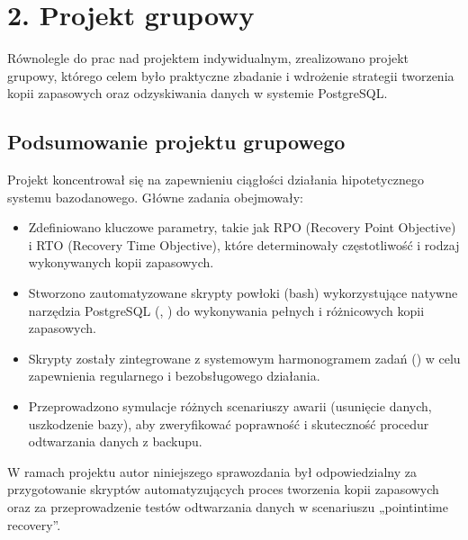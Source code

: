 \documentclass[letterpaper,10pt,polish]{sphinxmanual}
\begin{document}
\sphinxstepscope


\chapter{2. Projekt grupowy}
\label{\detokenize{rozdzial2/rozdzial2:projekt-grupowy}}\label{\detokenize{rozdzial2/rozdzial2::doc}}
\sphinxAtStartPar
Równolegle do prac nad projektem indywidualnym, zrealizowano projekt grupowy, którego celem było praktyczne zbadanie i wdrożenie strategii tworzenia kopii zapasowych oraz odzyskiwania danych w systemie PostgreSQL.


\section{Podsumowanie projektu grupowego}
\label{\detokenize{rozdzial2/rozdzial2:podsumowanie-projektu-grupowego}}
\sphinxAtStartPar
Projekt koncentrował się na zapewnieniu ciągłości działania hipotetycznego systemu bazodanowego. Główne zadania obejmowały:
\begin{itemize}
\item {} 
\sphinxAtStartPar
{} Zdefiniowano kluczowe parametry, takie jak RPO (Recovery Point Objective) i RTO (Recovery Time Objective), które determinowały częstotliwość i rodzaj wykonywanych kopii zapasowych.

\item {} 
\sphinxAtStartPar
{} Stworzono zautomatyzowane skrypty powłoki (bash) wykorzystujące natywne narzędzia PostgreSQL (, ) do wykonywania pełnych i różnicowych kopii zapasowych.

\item {} 
\sphinxAtStartPar
{} Skrypty zostały zintegrowane z systemowym harmonogramem zadań () w celu zapewnienia regularnego i bezobsługowego działania.

\item {} 
\sphinxAtStartPar
{} Przeprowadzono symulacje różnych scenariuszy awarii (usunięcie danych, uszkodzenie bazy), aby zweryfikować poprawność i skuteczność procedur odtwarzania danych z backupu.

\end{itemize}

\sphinxAtStartPar
W ramach projektu autor niniejszego sprawozdania był odpowiedzialny za przygotowanie skryptów automatyzujących proces tworzenia kopii zapasowych oraz za przeprowadzenie testów odtwarzania danych w scenariuszu „point\sphinxhyphen{}in\sphinxhyphen{}time recovery”.
\end{document}
